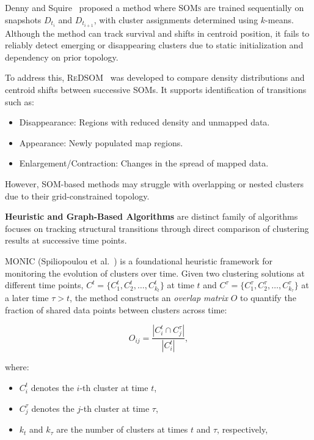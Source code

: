 Denny and Squire~\cite{som_tracking} proposed a method where \textsc{SOMs} are
trained sequentially on snapshots $D_{t_i}$ and $D_{t_{i+1}}$, with cluster
assignments determined using $k$-means. Although the method can track survival
and shifts in centroid position, it fails to reliably detect emerging or
disappearing clusters due to static initialization and dependency on prior
topology.

To address this, \textsc{ReDSOM}~\cite{redsom_tracking} was developed to
compare density distributions and centroid shifts between successive SOMs. It
supports identification of transitions such as:

\begin{itemize}
    \item Disappearance: Regions with reduced density and unmapped data.

    \item Appearance: Newly populated map regions.

    \item Enlargement/Contraction: Changes in the spread of mapped data.
\end{itemize}

However, SOM-based methods may struggle with overlapping or nested clusters due
to their grid-constrained topology.

\textbf{Heuristic and Graph-Based Algorithms} are distinct family of algorithms focuses
on tracking structural transitions through direct comparison of clustering results at
successive time points.

\textsc{MONIC} (Spiliopoulou et al.~\cite{monic}) is a foundational heuristic framework
for monitoring the evolution of clusters over time. Given two clustering solutions at
different time points, $C^t = \{C_1^t, C_2^t, \dots, C_{k_t}^t\}$ at time
$t$ and $C^{\tau} = \{C_1^{\tau}, C_2^{\tau}, \dots, C_{k_{\tau}}^{\tau}\}$ at a
later time $\tau > t$, the method constructs an \emph{overlap matrix} $O$ to quantify
the fraction of shared data points between clusters across time:

\begin{equation}
    O_{ij} = \frac{|C_i^t \cap C_j^{\tau}|}{|C_i^t|},
\end{equation}

where:
\begin{itemize}
    \item $C_i^t$ denotes the $i$-th cluster at time $t$,
    \item $C_j^{\tau}$ denotes the $j$-th cluster at time $\tau$,
    \item $k_t$ and $k_{\tau}$ are the number of clusters at times $t$ and $\tau$, respectively,
\end{itemize}

